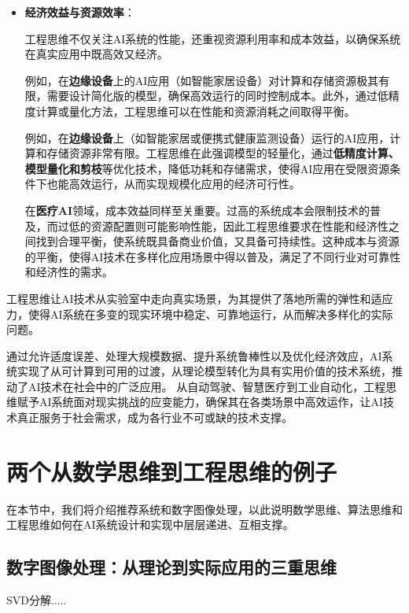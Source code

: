 \begin{itemize}
综上，通过对鲁棒性的重视和设计，工程思维确保了AI系统在复杂且不确定的环境中依然保持高效和稳定的表现，使得AI在实际应用中更加可靠和可用，能够在不同环境下正常运行，应对各种现实干扰。

\item {\bf 经济效益与资源效率}：

工程思维不仅关注AI系统的性能，还重视资源利用率和成本效益，以确保系统在真实应用中既高效又经济。

例如，在{\bf 边缘设备}上的AI应用（如智能家居设备）对计算和存储资源极其有限，需要设计简化版的模型，确保高效运行的同时控制成本。此外，通过低精度计算或量化方法，工程思维可以在性能和资源消耗之间取得平衡。

例如，在{\bf 边缘设备}上（如智能家居或便携式健康监测设备）运行的AI应用，计算和存储资源非常有限。工程思维在此强调模型的轻量化，通过{\bf 低精度计算、模型量化和剪枝}等优化技术，降低功耗和存储需求，使得AI应用在受限资源条件下也能高效运行，从而实现规模化应用的经济可行性。

在{\bf 医疗AI}领域，成本效益同样至关重要。过高的系统成本会限制技术的普及，而过低的资源配置则可能影响性能，因此工程思维要求在性能和经济性之间找到合理平衡，使系统既具备商业价值，又具备可持续性。这种成本与资源的平衡，使得AI技术在多样化应用场景中得以普及，满足了不同行业对可靠性和经济性的需求。

\end{itemize}
工程思维让AI技术从实验室中走向真实场景，为其提供了落地所需的弹性和适应力，使得AI系统在多变的现实环境中稳定、可靠地运行，从而解决多样化的实际问题。

通过允许适度误差、处理大规模数据、提升系统鲁棒性以及优化经济效应，AI系统实现了从可计算到可用的过渡，从理论模型转化为具有实用价值的技术系统，推动了AI技术在社会中的广泛应用。
从自动驾驶、智慧医疗到工业自动化，工程思维赋予AI系统面对现实挑战的应变能力，确保其在各类场景中高效运作，让AI技术真正服务于社会需求，成为各行业不可或缺的技术支撑。

\section{两个从数学思维到工程思维的例子}

在本节中，我们将介绍推荐系统和数字图像处理，以此说明数学思维、算法思维和工程思维如何在AI系统设计和实现中层层递进、互相支撑。

\subsection{ 数字图像处理：从理论到实际应用的三重思维}
SVD分解.....

